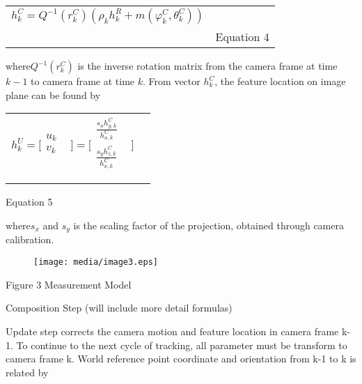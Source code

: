 \begin{table}[h]
\centering
\begin{tabular}{|l|l|}
\hline
$h_{ k}^{C}=Q^{-1}(r_{k}^{C})(\rho _{k}h_{k}^{R}+m(\varphi _{ 
k}^{C},\theta _{k}^{C}))$\\
 & Equation 4 \\
\hline
\end{tabular}
\end{table}
where$Q^{-1}(r_{k}^{C})$ is the inverse rotation matrix from the 
camera frame at time $k-1$ to camera frame at time $k$. From vector 
$h_{ k}^{C}$, the feature location on image plane can be found by

\begin{table}[h]
\centering
\begin{tabular}{|l|l|}
\hline
$h_{k}^{U}= \lbrack \begin{matrix}
u_{k} & \\
v_{k} & \\
\end{matrix}
\rbrack =\lbrack \begin{matrix}
\frac{s_{x}h_{y,k}^{C}}{h_{x,k}^{C}} & \\
\frac{s_{y}h_{z,k}^{C}}{h_{x,k}^{C}} & \\
\end{matrix}
\rbrack $\\
 & \\
\hline
\end{tabular}
\end{table}
Equation 5

where$s_{x}$ and $s_{y}$ is the scaling factor of the projection, 
obtained through camera calibration.

\begin{figure}[h]
\centering
\texttt{[image: media/image3.eps]}
\end{figure}


\begin{center}Figure 3 Measurement Model\end{center}





Composition Step (will include more detail formulas)

Update step corrects the camera motion and feature location in camera 
frame k-1. To continue to the next cycle of tracking, all parameter must 
be transform to camera frame k. World reference point coordinate and 
orientation from k-1 to k is related by

